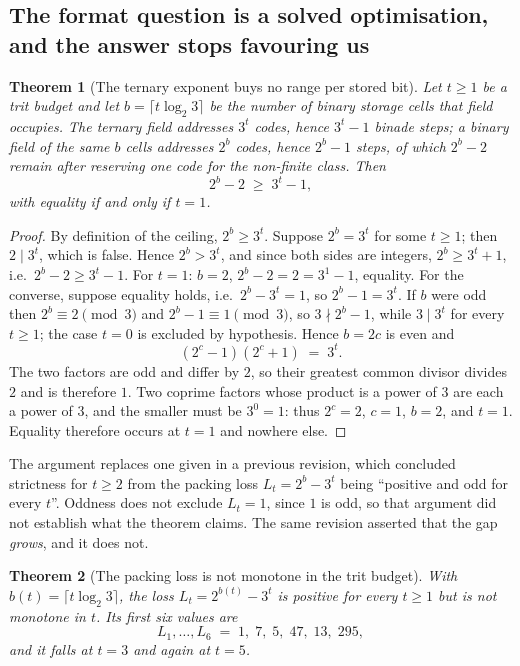 \documentclass[11pt]{article}
\newtheorem{theorem}{Theorem}
\theoremstyle{definition}
\begin{document}
\subsection{The format question is a solved optimisation, and the answer stops favouring us}
\label{sec:variantB}

\begin{theorem}[The ternary exponent buys no range per stored bit]
\label{thm:rangeperbit}
Let $t \ge 1$ be a trit budget and let $b = \lceil t\log_2 3\rceil$ be the number
of binary storage cells that field occupies. The ternary field addresses $3^t$
codes, hence $3^t - 1$ binade steps; a binary field of the same $b$ cells
addresses $2^b$ codes, hence $2^b - 1$ steps, of which $2^b - 2$ remain after
reserving one code for the non-finite class. Then
\[
2^b - 2 \;\ge\; 3^t - 1,
\]
with equality if and only if $t = 1$.
\end{theorem}

\begin{proof}
By definition of the ceiling, $2^b \ge 3^t$. Suppose $2^b = 3^t$ for some
$t \ge 1$; then $2 \mid 3^t$, which is false. Hence $2^b > 3^t$, and since both
sides are integers, $2^b \ge 3^t + 1$, i.e.\ $2^b - 2 \ge 3^t - 1$. For $t = 1$:
$b = 2$, $2^b - 2 = 2 = 3^1 - 1$, equality. For the converse, suppose equality
holds, i.e.\ $2^b - 3^t = 1$, so $2^b - 1 = 3^t$. If $b$ were odd then
$2^b \equiv 2 \pmod 3$ and $2^b - 1 \equiv 1 \pmod 3$, so $3 \nmid 2^{b}-1$, while
$3 \mid 3^{t}$ for every $t \ge 1$; the case $t = 0$ is excluded by hypothesis. Hence $b = 2c$ is even and
\[
  (2^{c}-1)(2^{c}+1) \;=\; 3^{t}.
\]
The two factors are odd and differ by $2$, so their greatest common divisor
divides $2$ and is therefore $1$. Two coprime factors whose product is a power of
$3$ are each a power of $3$, and the smaller must be $3^0 = 1$: thus $2^{c} = 2$,
$c = 1$, $b = 2$, and $t = 1$. Equality therefore occurs at $t = 1$ and nowhere
else.
\end{proof}

The argument replaces one given in a previous revision, which concluded strictness
for $t \ge 2$ from the packing loss $L_t = 2^{b} - 3^{t}$ being ``positive and odd
for every $t$''. Oddness does not exclude $L_t = 1$, since $1$ is odd, so that
argument did not establish what the theorem claims. The same revision asserted
that the gap \emph{grows}, and it does not.

\begin{theorem}[The packing loss is not monotone in the trit budget]
\label{thm:lossnonmonotone}
With $b(t) = \lceil t \log_2 3\rceil$, the loss $L_t = 2^{b(t)} - 3^{t}$ is
positive for every $t \ge 1$ but is not monotone in $t$. Its first six values are
\[
  L_1,\dots,L_6 \;=\; 1,\; 7,\; 5,\; 47,\; 13,\; 295 ,
\]
and it falls at $t = 3$ and again at $t = 5$.
\end{theorem}
\end{document}
